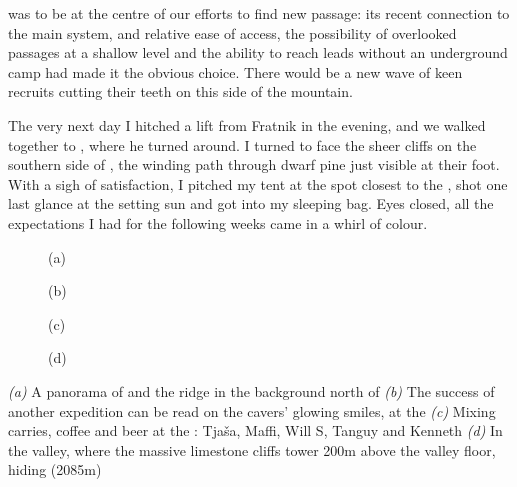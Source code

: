  was to be at the centre of our efforts to find new passage: its recent connection to the main system, and relative ease of access, the possibility of overlooked passages at a shallow level and the ability to reach leads without an underground camp had made it the obvious choice. There would be a new wave of keen recruits cutting their teeth on this side of the mountain. 

The very next day I hitched a lift from Fratnik in the evening, and we walked together to , where he turned around. I turned to face the sheer cliffs on the southern side of , the winding path through dwarf pine just visible at their foot. With a sigh of satisfaction, I pitched my tent at the spot closest to the , shot one last glance at the setting sun and got into my sleeping bag. Eyes closed, all the expectations I had for the following weeks came in a whirl of colour.


\begin{pagefigure}
\checkoddpage \ifoddpage \forcerectofloat \else \forceversofloat \fi
   \centering
    \begin{subfigure}[t]{\textwidth}
    \centering
        \caption{(a)} \label{Panoramafrom tolmin}
    \end{subfigure}
    \begin{subfigure}[t]{0.45\textwidth}
        \centering
        \caption{(b)} \label{selfie}
    \end{subfigure}
    \begin{subfigure}[t]{0.53\textwidth}
        \centering
        \caption{(c)} \label{Kal}
    \end{subfigure}
  \hfill
    \centering
    \begin{subfigure}[t]{\textwidth}
        \centering
        \caption{(d)} \label{limestone cliffs}
    \end{subfigure}
  

    \caption{
    \emph{(a)} A panorama of \protect{} and the \protect{} ridge in the background
north of \protect{} 
\emph{(b)} The success of another expedition can be read on the cavers' glowing smiles, at the \protect{} 
    \emph{(c)} Mixing carries, coffee and beer at the \protect{}: Tja\v{s}a, Maffi, Will S, Tanguy and Kenneth 
    \emph{(d)} In the \protect{} valley, where the massive limestone cliffs tower 200m above the valley floor, hiding \protect{} (2085m) 
    }
\end{pagefigure}